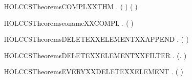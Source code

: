 \begin{SaveVerbatim}{HOLCCSTheoremsCOMPLXXTHM}
\HOLTokenTurnstile{} \HOLSymConst{\HOLTokenForall{}} .
       ( \HOLSymConst{\HOLTokenNotEqual{}}   \HOLSymConst{\HOLTokenImp{}}   \HOLSymConst{\HOLTokenNotEqual{}}  ) \HOLSymConst{\HOLTokenConj{}}
       ( \HOLSymConst{\HOLTokenNotEqual{}}   \HOLSymConst{\HOLTokenImp{}}   \HOLSymConst{\HOLTokenNotEqual{}}  )
\end{SaveVerbatim}
\newcommand{\HOLCCSTheoremsCOMPLXXTHM}{\UseVerbatim{HOLCCSTheoremsCOMPLXXTHM}}
\begin{SaveVerbatim}{HOLCCSTheoremsconameXXCOMPL}
\HOLTokenTurnstile{} \HOLSymConst{\HOLTokenForall{}}.   \HOLSymConst{=}  ( )
\end{SaveVerbatim}
\newcommand{\HOLCCSTheoremsconameXXCOMPL}{\UseVerbatim{HOLCCSTheoremsconameXXCOMPL}}
\begin{SaveVerbatim}{HOLCCSTheoremsDELETEXXELEMENTXXAPPEND}
\HOLTokenTurnstile{} \HOLSymConst{\HOLTokenForall{}}  .
         ( \HOLSymConst{++} ) \HOLSymConst{=}
          \HOLSymConst{++}   
\end{SaveVerbatim}
\newcommand{\HOLCCSTheoremsDELETEXXELEMENTXXAPPEND}{\UseVerbatim{HOLCCSTheoremsDELETEXXELEMENTXXAPPEND}}
\begin{SaveVerbatim}{HOLCCSTheoremsDELETEXXELEMENTXXFILTER}
\HOLTokenTurnstile{} \HOLSymConst{\HOLTokenForall{}} .    \HOLSymConst{=}  (\HOLTokenLambda{}.  \HOLSymConst{\HOLTokenNotEqual{}} ) 
\end{SaveVerbatim}
\newcommand{\HOLCCSTheoremsDELETEXXELEMENTXXFILTER}{\UseVerbatim{HOLCCSTheoremsDELETEXXELEMENTXXFILTER}}
\begin{SaveVerbatim}{HOLCCSTheoremsEVERYXXDELETEXXELEMENT}
\HOLTokenTurnstile{} \HOLSymConst{\HOLTokenForall{}}  .   \HOLSymConst{\HOLTokenConj{}}   (  ) \HOLSymConst{\HOLTokenImp{}}   
\end{SaveVerbatim}
